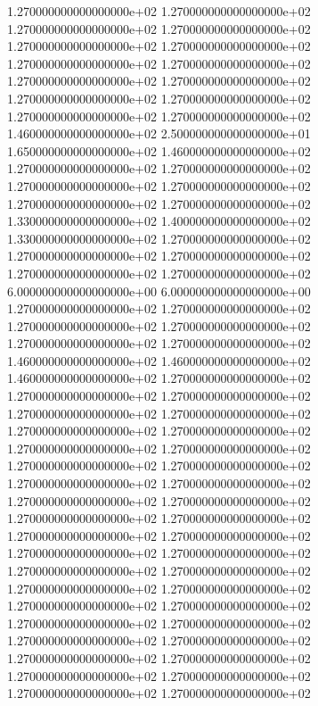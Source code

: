 1.270000000000000000e+02 1.270000000000000000e+02 1.270000000000000000e+02 1.270000000000000000e+02 1.270000000000000000e+02 1.270000000000000000e+02 1.270000000000000000e+02 1.270000000000000000e+02 1.270000000000000000e+02 1.270000000000000000e+02 1.270000000000000000e+02 1.270000000000000000e+02 1.270000000000000000e+02 1.270000000000000000e+02 1.460000000000000000e+02 2.500000000000000000e+01 1.650000000000000000e+02 1.460000000000000000e+02 1.270000000000000000e+02 1.270000000000000000e+02 1.270000000000000000e+02 1.270000000000000000e+02 1.270000000000000000e+02 1.270000000000000000e+02 1.330000000000000000e+02 1.400000000000000000e+02 1.330000000000000000e+02 1.270000000000000000e+02 1.270000000000000000e+02 1.270000000000000000e+02 1.270000000000000000e+02 1.270000000000000000e+02 6.000000000000000000e+00 6.000000000000000000e+00 1.270000000000000000e+02 1.270000000000000000e+02 1.270000000000000000e+02 1.270000000000000000e+02 1.270000000000000000e+02 1.270000000000000000e+02 1.460000000000000000e+02 1.460000000000000000e+02 1.460000000000000000e+02 1.270000000000000000e+02 1.270000000000000000e+02 1.270000000000000000e+02 1.270000000000000000e+02 1.270000000000000000e+02 1.270000000000000000e+02 1.270000000000000000e+02 1.270000000000000000e+02 1.270000000000000000e+02 1.270000000000000000e+02 1.270000000000000000e+02 1.270000000000000000e+02 1.270000000000000000e+02 1.270000000000000000e+02 1.270000000000000000e+02 1.270000000000000000e+02 1.270000000000000000e+02 1.270000000000000000e+02 1.270000000000000000e+02 1.270000000000000000e+02 1.270000000000000000e+02 1.270000000000000000e+02 1.270000000000000000e+02 1.270000000000000000e+02 1.270000000000000000e+02 1.270000000000000000e+02 1.270000000000000000e+02 1.270000000000000000e+02 1.270000000000000000e+02 1.270000000000000000e+02 1.270000000000000000e+02 1.270000000000000000e+02 1.270000000000000000e+02 1.270000000000000000e+02 1.270000000000000000e+02 1.270000000000000000e+02 1.270000000000000000e+02
